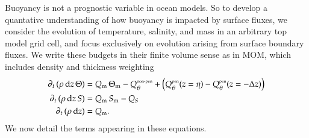 Buoyancy is not a prognostic variable in ocean models.  So to develop
a quantative understanding of how buoyancy is impacted by surface
fluxes, we consider the evolution of temperature, salinity, and mass
in an arbitrary top model grid cell, and focus exclusively on
evolution arising from surface boundary fluxes.  We write these
budgets in their finite volume sense as in MOM, which includes density
and thickness weighting
\begin{align}
 \partial_{t} \, (\rho \, \mathrm{d}z \, \Theta) &=  Q_{\mbox{\scriptsize m}} \, \Theta_{\mbox{\scriptsize m}} 
  - Q_{\theta}^{\mbox{\tiny non-pen}} 
  + \left( Q_{\theta}^{\mbox{\tiny pen}}(z=\eta) - Q_{\theta}^{\mbox{\tiny pen}}(z=-\Delta z) 
     \right)
 \label{eq:surface-temperature-equation-kpp}
\\
 \partial_{t} \, (\rho \, \mathrm{d}z \, S) &=  Q_{\mbox{\scriptsize m}} \, S_{\mbox{\scriptsize m}} - Q_{S}
 \label{eq:surface-salinity-equation-kpp}
  \\
 \partial_{t} \, (\rho \, \mathrm{d}z) &=
  Q_{\mbox{\scriptsize m}}.
 \label{eq:surface-mass-equation-kpp}
\end{align}
 We now detail the terms appearing in these equations.  
